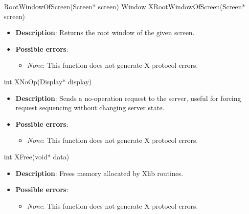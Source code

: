 \documentclass{report}
\begin{document}
\begin{itemize}
        \begin{cppcode}
            RootWindowOfScreen(Screen* screen)
            Window XRootWindowOfScreen(Screen* screen)
        \end{cppcode}
        \begin{itemize}
            \item \textbf{Description}: Returns the root window of the given screen.
            \item \textbf{Possible errors}:
                \begin{itemize}
                    \item \textit{None}: This function does not generate X protocol errors.
                \end{itemize}
        \end{itemize}

        \begin{cppcode}
            int XNoOp(Display* display)
        \end{cppcode}
        \begin{itemize}
            \item \textbf{Description}: Sends a no-operation request to the server, useful for forcing request sequencing without changing server state.
            \item \textbf{Possible errors}:
                \begin{itemize}
                    \item \textit{None}: This function does not generate X protocol errors.
                \end{itemize}
        \end{itemize}

        \begin{cppcode}
            int XFree(void* data)
        \end{cppcode}
        \begin{itemize}
            \item \textbf{Description}: Frees memory allocated by Xlib routines.
            \item \textbf{Possible errors}:
                \begin{itemize}
                    \item \textit{None}: This function does not generate X protocol errors.
                \end{itemize}
        \end{itemize}


\end{itemize}
\end{document}
